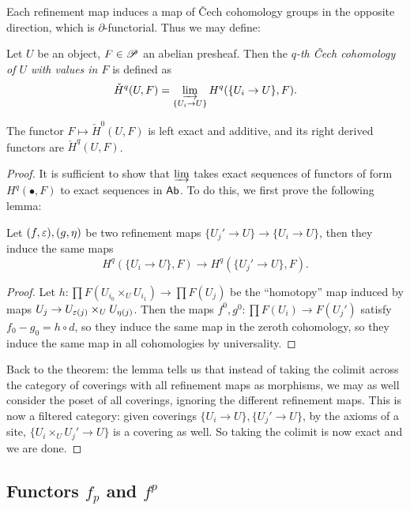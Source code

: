\documentclass[11pt]{amsart}
\begin{document}
Each refinement map induces a map of \v{C}ech cohomology groups in the opposite direction, which is $\partial$-functorial. Thus we may define:

\begin{defn}
    Let $U$ be an object, $F\in \mathscr{P}$ an abelian presheaf. Then the \emph{$q$-th \v{C}ech cohomology of $U$ with values in $F$} is defined as
    \[\check{H}^q(U, F) = \varinjlim_{\{U_i\to U\}} H^q(\{U_i\to U\}, F).\]
\end{defn}

\begin{thm}
    The functor $F\mapsto \check{H}^0(U, F)$ is left exact and additive, and its right derived functors are $\check{H}^q(U, F)$.
\end{thm}

\begin{proof}
    It is sufficient to show that $\varinjlim$ takes exact sequences of functors of form $H^q(\bullet, F)$ to exact sequences in $\mathsf{Ab}$. To do this, we first prove the following lemma:

    \begin{lem}
    \label{unique_homology_from_refinement}
    Let $(f,\varepsilon),(g,\eta)$ be two refinement maps $\{U_j'\to U\} \to \{U_i\to U\}$, then they induce the same maps
    \[H^q(\{U_i\to U\}, F) \to H^q(\{U_j'\to U\}, F).\]
    \end{lem}

    \begin{proof}
        Let $h: \prod F(U_{i_0}\times_U U_{i_1}) \to \prod F(U_j)$ be the ``homotopy'' map induced by maps $U_j\to U_{\varepsilon(j)}\times_U U_{\eta(j)}$. Then the maps $f^0,g^0: \prod F(U_i) \to F(U_j')$ satisfy $f_0 - g_0 = h\circ d$, so they induce the same map in the zeroth cohomology, so they induce the same map in all cohomologies by universality.
    \end{proof}

Back to the theorem: the lemma tells us that instead of taking the colimit across the category of coverings with all refinement maps as morphisms, we may as well consider the poset of all coverings, ignoring the different refinement maps. This is now a filtered category: given coverings $\{U_i\to U\}, \{U_j'\to U\}$, by the axioms of a site, $\{U_i\times_U U_j' \to U\}$ is a covering as well. So taking the colimit is now exact and we are done.
\end{proof}



\subsection{Functors $f_p$ and $f^p$}
\end{document}
